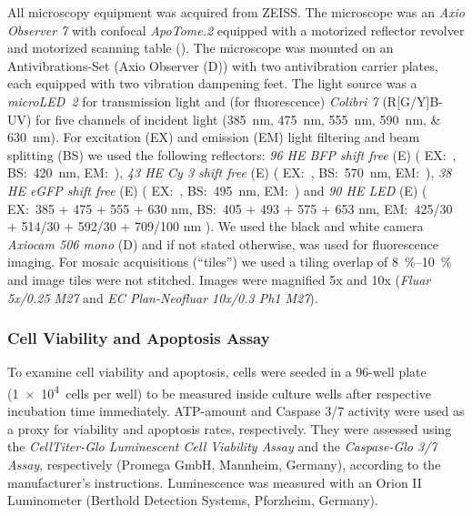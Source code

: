 All microscopy equipment was acquired from
ZEISS. The microscope was an \textit{Axio Observer 7} with confocal
\textit{ApoTome.2} equipped with a motorized reflector revolver and motorized
scanning table (). The microscope was mounted on an
Antivibrations-Set (Axio Observer (D)) with two antivibration carrier plates,
each equipped with two vibration dampening feet. The light source was a
\textit{microLED~2} for transmission light and (for fluorescence)
\textit{Colibri 7} (R[G/Y]B-UV) for five channels of incident light
(\SIlist{385;475;555;590;630}{nm}).
%
For excitation (EX) and
emission (EM) light filtering and beam splitting (BS) we used the following
reflectors:
\textit{96 HE BFP shift free} (E) (%
EX:~,
BS:~\SI{420}{nm},
EM:~),
%
\textit{43 HE Cy 3 shift free} (E) (%
EX:~,
BS:~\SI{570}{nm},
EM:~),
%
\textit{38 HE eGFP shift free} (E) (%
EX:~,
BS:~\SI{495}{nm},
EM:~) and
%
\textit{90 HE LED} (E) (%
EX:~385 + 475 + 555 + 630 \si{nm},
BS:~405 + 493 + 575 + 653 \si{nm},
EM:~425/30 + 514/30 + 592/30 + 709/100 \si{nm}%
).
We used the black and white camera \textit{Axiocam 506 mono} (D) and if not stated
otherwise,  was used for fluorescence imaging. For mosaic
acquisitions (“tiles”) we used a tiling overlap of \SIrange{8}{10}{\percent} and
image tiles were not stitched. Images were magnified 5x and 10x (\textit{Fluar
    5x/0.25 M27} and \textit{EC Plan-Neofluar 10x/0.3 Ph1 M27}).


\subsubsection*{Cell Viability and Apoptosis Assay}
To examine cell viability and apoptosis, cells were seeded in a 96-well plate
(\SI{1e4}{cells} per well) to be measured inside culture wells after respective
incubation time immediately. ATP-amount and Caspase 3/7 activity were used as a
proxy for viability and apoptosis rates, respectively. They were assessed using
the \textit{CellTiter-Glo Luminescent Cell Viability Assay} and the
\textit{Caspase-Glo 3/7 Assay}, respectively (Promega GmbH, Mannheim, Germany),
according to the manufacturer's instructions. Luminescence was measured with an
Orion II Luminometer (Berthold Detection Systems, Pforzheim, Germany).


